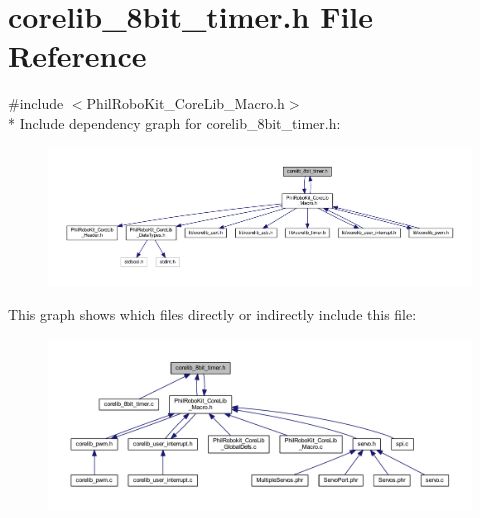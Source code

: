 \section{corelib\-\_\-8bit\-\_\-timer.\-h File Reference}
\label{corelib__8bit__timer_8h}
{\ttfamily \#include $<$Phil\-Robo\-Kit\-\_\-\-Core\-Lib\-\_\-\-Macro.\-h$>$}\\*
Include dependency graph for corelib\-\_\-8bit\-\_\-timer.\-h\-:\nopagebreak
\begin{figure}[H]
\begin{center}
\leavevmode
\includegraphics[width=350pt]{corelib__8bit__timer_8h__incl}
\end{center}
\end{figure}
This graph shows which files directly or indirectly include this file\-:\nopagebreak
\begin{figure}[H]
\begin{center}
\leavevmode
\includegraphics[width=350pt]{corelib__8bit__timer_8h__dep__incl}
\end{center}
\end{figure}
